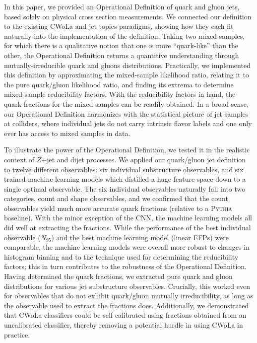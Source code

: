 \documentclass[letterpaper,11pt]{article}
\newcommand{\pythia}{\textsc{Pythia}\xspace}
\begin{document}
In this paper, we provided an Operational Definition of quark and gluon jets, based solely on physical cross section measurements. 
%
We connected our definition to the existing CWoLa and jet topics paradigms, showing how they each fit naturally into the implementation of the definition.
%
Taking two mixed samples, for which there is a qualitative notion that one is more ``quark-like'' than the other, the Operational Definition returns a quantitive understanding through mutually-irreducible quark and gluons distributions.
%
Practically, we implemented this definition by approximating the mixed-sample likelihood ratio, relating it to the pure quark/gluon likelihood ratio, and finding its extrema to determine mixed-sample reducibility factors.
%
With the reducibility factors in hand, the quark fractions for the mixed samples can be readily obtained.
%
In a broad sense, our Operational Definition harmonizes with the statistical picture of jet samples at colliders, where individual jets do not carry intrinsic flavor labels and one only ever has access to mixed samples in data.


To illustrate the power of the Operational Definition, we tested it in the realistic context of $Z$+jet and dijet processes.
%
We applied our quark/gluon jet definition to twelve different observables:  six individual substructure observables, and six trained machine learning models which distilled a huge feature space down to a single optimal observable.
%
The six individual observables naturally fall into two categories, count and shape observables, and we confirmed that the count observables yield much more accurate quark fractions (relative to a \pythia baseline).
%
With the minor exception of the CNN, the machine learning models all did well at extracting the fractions.
%
While the performance of the best individual observable ($N_{95}$) and the best machine learning model (linear EFPs) were comparable, the machine learning models were overall more robust to changes in histogram binning and to the technique used for determining the reducibility factors; this in turn contributes to the robustness of the Operational Definition.
%
Having determined the quark fractions, we extracted pure quark and gluon distributions for various jet substructure observables.
%
Crucially, this worked even for observables that do not exhibit quark/gluon mutually irreducibility, as long as the observable used to extract the fractions does.
%
Additionally, we demonstrated that CWoLa classifiers could be self calibrated using fractions obtained from an uncalibrated classifier, thereby removing a potential hurdle in using CWoLa in practice.
\end{document}
